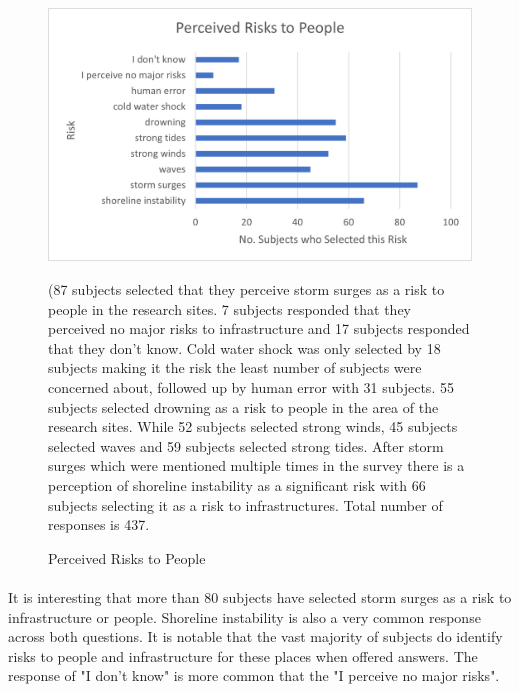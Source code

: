 \begin{figure}[H]
    \centering
    \includegraphics{fig_results/percieved risks to people.png}
    \caption{Perceived Risks to People}{ (87 subjects selected that they perceive storm surges as a risk to people in the research sites. 7 subjects responded that they perceived no major risks to infrastructure and 17 subjects responded that they don't know. Cold water shock was only selected by 18 subjects making it the risk the least number of subjects were concerned about, followed up by human error with 31 subjects. 55 subjects selected drowning as a risk to people in the area of the research sites. While 52 subjects selected strong winds, 45 subjects selected waves and 59 subjects selected strong tides. After storm surges which were mentioned multiple times in the survey there is a perception of shoreline instability as a significant risk with 66 subjects selecting it as a risk to infrastructures.  Total number of responses is 437.
    
    }
    \label{fig:risk_people}
\end{figure}
\paragraph{}
It is interesting that more than 80 subjects have selected storm surges as a risk to infrastructure or people. Shoreline instability is also a very common response across both questions. It is notable that the vast majority of subjects do identify risks to people and infrastructure for these places when offered answers. The response of "I don't know" is more common that the "I perceive no major risks". 


